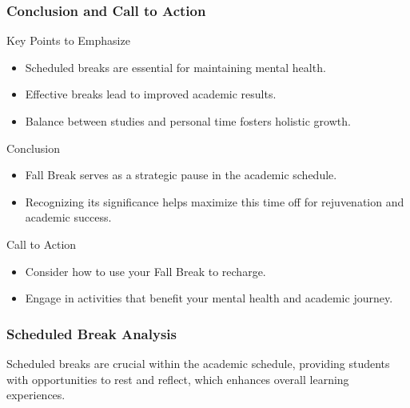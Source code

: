 \documentclass[aspectratio=169]{beamer}
\begin{document}
\begin{frame}[fragile]
    \frametitle{Conclusion and Call to Action}
    \begin{block}{Key Points to Emphasize}
        \begin{itemize}
            \item Scheduled breaks are essential for maintaining mental health.
            \item Effective breaks lead to improved academic results.
            \item Balance between studies and personal time fosters holistic growth.
        \end{itemize}
    \end{block}
    \begin{block}{Conclusion}
        \begin{itemize}
            \item Fall Break serves as a strategic pause in the academic schedule.
            \item Recognizing its significance helps maximize this time off for rejuvenation and academic success.
        \end{itemize}
    \end{block}
    \begin{block}{Call to Action}
        \begin{itemize}
            \item Consider how to use your Fall Break to recharge.
            \item Engage in activities that benefit your mental health and academic journey.
        \end{itemize}
    \end{block}
\end{frame}

\begin{frame}[fragile]
    \frametitle{Scheduled Break Analysis}
    Scheduled breaks are crucial within the academic schedule, providing students with opportunities to rest and reflect, which enhances overall learning experiences.
\end{frame}
\end{document}
